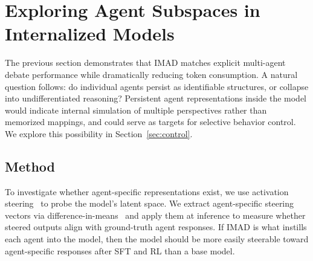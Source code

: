 \documentclass[11pt]{article}
\begin{document}
\section{Exploring Agent Subspaces in Internalized Models} \label{sec:steering}
The previous section demonstrates that IMAD matches explicit multi-agent debate performance while dramatically reducing token consumption.
A natural question follows: do individual agents persist as identifiable structures, or collapse into undifferentiated reasoning?
Persistent agent representations inside the model would indicate internal simulation of multiple perspectives rather than memorized mappings, and could serve as targets for selective behavior control. 
We explore this possibility in Section~\ref{sec:control}.

\subsection{Method}
To investigate whether agent-specific representations exist, we use activation steering~\cite{subramani2022extracting, turner2023steering, rimsky2024steering} to probe the model's latent space. 
We extract agent-specific steering vectors via difference-in-means~\cite{marks2023geometry} and apply them at inference to measure whether steered outputs align with ground-truth agent responses. 
If IMAD is what instills each agent into the model, then the model should be more easily steerable toward agent-specific responses after SFT and RL than a base model.
\end{document}
